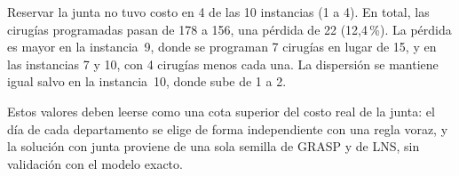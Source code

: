 Reservar la junta no tuvo costo en 4 de las 10 instancias (1 a 4). En total, las cirugías programadas pasan de 178 a 156, una pérdida de 22 (12,4\,\%). La pérdida es mayor en la instancia~9, donde se programan 7 cirugías en lugar de 15, y en las instancias 7 y 10, con 4 cirugías menos cada una. La dispersión se mantiene igual salvo en la instancia~10, donde sube de 1 a 2.

Estos valores deben leerse como una cota superior del costo real de la junta: el día de cada departamento se elige de forma independiente con una regla voraz, y la solución con junta proviene de una sola semilla de GRASP y de LNS, sin validación con el modelo exacto.